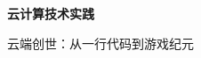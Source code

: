 \documentclass[12pt, a4paper]{article}
\begin{document}
\begin{titlepage}
    \centering
    \vspace*{2cm}
    
    {\Huge \bfseries 云计算技术实践\par}
    
    \vspace{1.5cm}
    
    {\Large 云端创世：从一行代码到游戏纪元\par}
    
    \vspace{2cm}

    
    \vfill
\end{titlepage}

\tableofcontents
\newpage











\appendix




% 



% 
\end{document}
